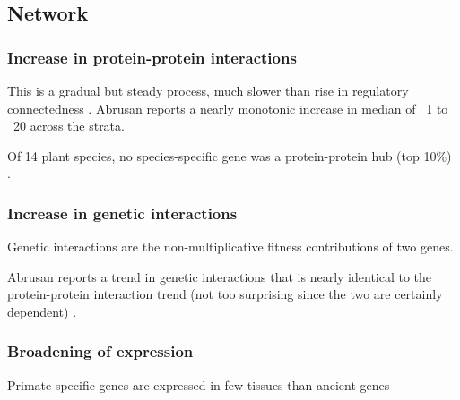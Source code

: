 
    \FloatBarrier

\subsection{Network}

  \subsubsection{Increase in protein-protein interactions}

    This is a gradual but steady process, much slower than rise in
    regulatory connectedness \cite{abrusan_integration_2013}. Abrusan
    reports a nearly monotonic increase in median of ~1 to ~20 across
    the strata.

    Of 14 plant species, no species-specific gene was a protein-protein
    hub (top 10\%) \cite{ye_evolutionary_2013}.

    \FloatBarrier

  \subsubsection{Increase in genetic interactions}

    Genetic interactions are the non-multiplicative fitness
    contributions of two genes.

    Abrusan reports a trend in genetic interactions that is nearly
    identical to the protein-protein interaction trend (not too
    surprising since the two are certainly dependent)
    \cite{abrusan_integration_2013}.

  \subsubsection{Broadening of expression}

    Primate specific genes are expressed in few tissues than ancient
    genes \cite{toll-riera_origin_2009}

